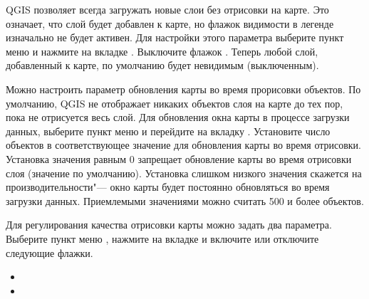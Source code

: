 \label{label_settinglayer}

QGIS позволяет всегда загружать новые слои без отрисовки на карте. Это
означает, что слой будет добавлен к карте, но
флажок видимости в легенде изначально не будет активен. Для настройки
этого параметра выберите пункт меню  \arrow
{} и нажмите на вкладке . Выключите
флажок . Теперь
любой слой, добавленный к карте, по умолчанию будет невидимым (выключенным).

%
%

\label{label_updatemap}

Можно настроить параметр обновления карты во время прорисовки объектов.
По умолчанию, QGIS не отображает никаких объектов слоя на карте до тех пор,
пока не отрисуется весь слой. Для обновления окна карты в процессе загрузки данных,
выберите пункт меню  \arrow
{} и перейдите на вкладку . Установите
число объектов в соответствующее значение для обновления карты во время
отрисовки. Установка значения равным 0 запрещает обновление карты во время
отрисовки слоя (значение по умолчанию). Установка слишком низкого значения
скажется на производительности"--- окно карты будет постоянно обновляться
во время загрузки данных. Приемлемыми значениями можно считать 500 и более объектов.

\label{label_renderquality}

Для регулирования качества отрисовки карты можно задать два параметра.
Выберите пункт меню  \arrow {},
нажмите на вкладке  и включите или отключите следующие флажки.

\begin{itemize}
\item {}
\item {}
\end{itemize}

